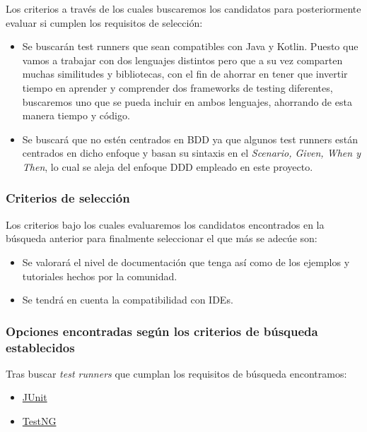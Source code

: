 Los criterios a través de los cuales buscaremos los candidatos para
posteriormente evaluar si cumplen los requisitos de selección:
\begin{itemize}
    \item Se buscarán test runners que sean compatibles con Java y Kotlin.
    Puesto que vamos a trabajar con dos lenguajes distintos pero que a su vez
    comparten muchas similitudes y bibliotecas, con el fin de ahorrar en tener
    que invertir tiempo en aprender y comprender dos frameworks de testing
    diferentes, buscaremos uno que se pueda incluir en ambos lenguajes,
    ahorrando de esta manera tiempo y código. 
    \item Se buscará que no estén centrados en BDD ya que algunos test runners
    están centrados en dicho enfoque y basan su sintaxis en el \emph{Scenario,
    Given, When y Then}, lo cual se aleja del enfoque DDD empleado en este proyecto.
\end{itemize}

\subsubsection{Criterios de selección}

Los criterios bajo los cuales evaluaremos los candidatos encontrados en la
búsqueda anterior para finalmente seleccionar el que más se adecúe son:
\begin{itemize}
    \item Se valorará el nivel de documentación que tenga así como de los
    ejemplos y tutoriales hechos por la comunidad.
    \item Se tendrá en cuenta la compatibilidad con IDEs.
\end{itemize}


\subsubsection{Opciones encontradas según los criterios de búsqueda establecidos}

Tras buscar \emph{test runners} que cumplan los requisitos de búsqueda encontramos:

\begin{itemize}
    \item \href{https://junit.org/junit5/}{JUnit}
    \item \href{https://testng.org/doc/index.html}{TestNG}
\end{itemize}

